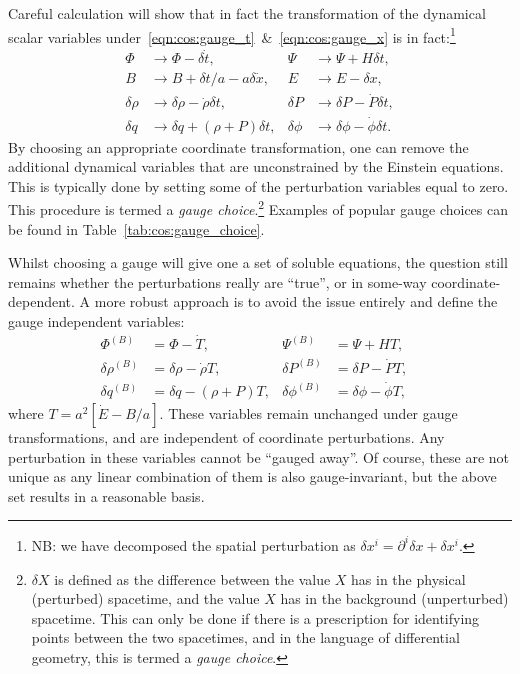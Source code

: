 Careful calculation will show that in fact the transformation of the dynamical scalar variables under~\eqref{eqn:cos:gauge_t}~\&~\eqref{eqn:cos:gauge_x} is in fact:\footnote{NB\@: we have decomposed the spatial perturbation as $\delta x^i = \partial^i \delta x + \delta x^i$.}
\begin{align}
  \Phi &\rightarrow \Phi - \delta \dot{t}, &
  \Psi &\rightarrow \Psi +H \delta t,  \nonumber\\
  B &\rightarrow B + \delta t/a - a\delta \dot{x}, &
  E &\rightarrow E - \delta x, \nonumber\\
  \delta\rho &\rightarrow \delta\rho - \dot{\rho}\delta t, &
  \delta P &\rightarrow \delta P - \dot{P}\delta t, \nonumber\\
  \delta q &\rightarrow \delta q + (\rho+P)\delta t,&
  \delta \phi &\rightarrow \delta \phi - \dot{\phi}\delta t.
\end{align}
By choosing an appropriate coordinate transformation, one can remove the additional dynamical variables that are unconstrained by the Einstein equations. This is typically done by setting some of the perturbation variables equal to zero. This procedure is termed a {\em gauge choice}.\footnote{$\delta X$ is defined as the difference between the value $X$ has in the physical (perturbed) spacetime, and the value $X$ has in the background (unperturbed) spacetime. This can only be done if there is a prescription for identifying points between the two spacetimes, and in the language of differential geometry, this is termed a {\em gauge choice}.}
Examples of popular gauge choices can be found in Table~\ref{tab:cos:gauge_choice}.

Whilst choosing a gauge will give one a set of soluble equations, the question still remains whether the perturbations really are ``true'', or in some-way coordinate-dependent. A more robust approach is to avoid the issue entirely and define the gauge independent variables:
\begin{align}
  \Phi^{(B)} &=  \Phi - \dot{T}, &
  \Psi^{(B)} &=  \Psi + HT, \nonumber \\
  \delta\rho^{(B)} &= \delta\rho - \dot{\rho}T, &
  \delta P^{(B)} &= \delta P - \dot{P}T, & \nonumber\\
  \delta q^{(B)} &= \delta q - (\rho + P)T, &
  \delta \phi^{(B)} &= \delta \phi - \dot{\phi}T, 
\end{align}
where $T = a^2[\dot{E}-B/a]$. These variables remain unchanged under gauge transformations, and are independent of coordinate perturbations. Any perturbation in these variables cannot be ``gauged away''. Of course, these are not unique as any linear combination of them is also gauge-invariant, but the above set results in a reasonable basis. 

